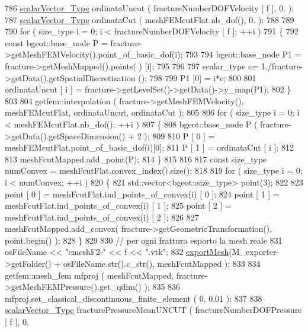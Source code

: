 \begin{DoxyCode}
786         \hyperlink{Core_8h_a4e75b5863535ba1dd79942de2846eff0}{scalarVector\_Type} ordinataUncut ( fractureNumberDOFVelocity [ f ], 0. );
787         \hyperlink{Core_8h_a4e75b5863535ba1dd79942de2846eff0}{scalarVector\_Type} ordinataCut ( meshFEMcutFlat.nb\_dof(), 0. );
788 
789     
790         \textcolor{keywordflow}{for} ( size\_type i = 0; i < fractureNumberDOFVelocity [ f ]; ++i )
791         \{
792             \textcolor{keyword}{const} bgeot::base\_node P = fracture->getMeshFEMVelocity().point\_of\_basic\_dof(i);
793 
794             bgeot::base\_node P1 = fracture->getMeshMapped().points( ) [i];
795 
796 
797             scalar\_type c= 1./fracture->getData().getSpatialDiscretization ();
798 
799             P1 [0] =  i*c;
800 
801             ordinataUncut [ i ] = fracture->getLevelSet()->getData()->y\_map(P1);
802         \}
803 
804         getfem::interpolation ( fracture->getMeshFEMVelocity(), meshFEMcutFlat, ordinataUncut, ordinataCut 
      );
805 
806         \textcolor{keywordflow}{for} ( size\_type i = 0; i < meshFEMcutFlat.nb\_dof(); ++i )
807         \{
808             bgeot::base\_node P ( fracture->getData().getSpaceDimension() + 2 );
809             
810             P [ 0 ] = meshFEMcutFlat.point\_of\_basic\_dof(i)[0];
811             P [ 1 ] = ordinataCut [ i ];
812             
813             meshFcutMapped.add\_point(P);
814         \}
815 
816 
817         \textcolor{keyword}{const} size\_type numConvex = meshFcutFlat.convex\_index().size();
818 
819         \textcolor{keywordflow}{for} ( size\_type i = 0; i < numConvex; ++i )
820         \{
821             std::vector<bgeot::size\_type> point(3);
822            
823             point [ 0 ] = meshFcutFlat.ind\_points\_of\_convex(i) [ 0 ];
824             point [ 1 ] = meshFcutFlat.ind\_points\_of\_convex(i) [ 1 ];
825             point [ 2 ] = meshFcutFlat.ind\_points\_of\_convex(i) [ 2 ];
826             
827             meshFcutMapped.add\_convex( fracture->getGeometricTransformation(), point.begin() );
828         \}
829 
830         \textcolor{comment}{// per ogni frattura esporto la mesh reale}
831         osFileName << \textcolor{stringliteral}{"cmeshF2-"} << f << \textcolor{stringliteral}{".vtk"};
832         \hyperlink{UsefulFunctions_8h_ae4bd400c144e72bee180107bb41ae72a}{exportMesh}(M\_exporter->getFolder() + osFileName.str().c\_str(), meshFcutMapped );
833 
834         getfem::mesh\_fem mfproj ( meshFcutMapped, fracture->getMeshFEMPressure().get\_qdim() );
835 
836         mfproj.set\_classical\_discontinuous\_finite\_element ( 0, 0.01 );
837 
838         \hyperlink{Core_8h_a4e75b5863535ba1dd79942de2846eff0}{scalarVector\_Type} fracturePressureMeanUNCUT ( fractureNumberDOFPressure [ f ], 0. 

\end{DoxyCode}
